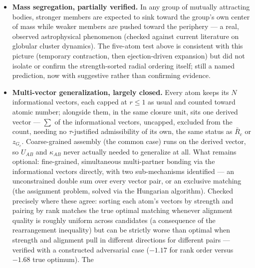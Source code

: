 \documentclass[12pt, a4paper]{article}
\begin{document}
\begin{itemize}
\begin{itemize}
            themselves.
      \end{itemize}
      Net honest state: the equation is right, softening is now
      derived, damping was shown not to belong at all --- but what
      the system was originally pictured as producing (one dominant,
      stable shape) is not what verified multi-body gravity actually
      gives. It gives ongoing, realistic evolution instead.
\item \textbf{Mass segregation, partially verified.} In any group of
      mutually attracting bodies, stronger members are expected to
      sink toward the group's own center of mass while weaker
      members are pushed toward the periphery --- a real, observed
      astrophysical phenomenon (checked against current literature
      on globular cluster dynamics). The five-atom test above is
      consistent with this picture (temporary contraction, then
      ejection-driven expansion) but did not isolate or confirm the
      strength-sorted radial ordering itself; still a named
      prediction, now with suggestive rather than confirming
      evidence.
\item \textbf{Multi-vector generalization, largely closed.} Every
      atom keeps its $N$ informational vectors, each capped at
      $r\le 1$ as usual and counted toward atomic number; alongside
      them, in the same closure unit, sits one derived vector ---
      $\sum$ of the informational vectors, uncapped, excluded from
      the count, needing no $\tau$-justified admissibility of its
      own, the same status as $\bar R_c$ or $z_{G_c}$. Coarse-grained
      assembly (the common case) runs on the derived vector, so
      $U_{AB}$ and $\kappa_{AB}$ never actually needed to generalize
      at all. What remains optional: fine-grained, simultaneous
      multi-partner bonding via the informational vectors directly,
      with two sub-mechanisms identified --- an unconstrained double
      sum over every vector pair, or an exclusive matching (the
      assignment problem, solved via the Hungarian algorithm).
      Checked precisely where these agree: sorting each atom's
      vectors by strength and pairing by rank matches the true
      optimal matching whenever alignment quality is roughly uniform
      across candidates (a consequence of the rearrangement
      inequality) but can be strictly worse than optimal when
      strength and alignment pull in different directions for
      different pairs --- verified with a constructed adversarial
      case ($-1.17$ for rank order versus $-1.68$ true optimum). The

\end{itemize}
\end{document}
